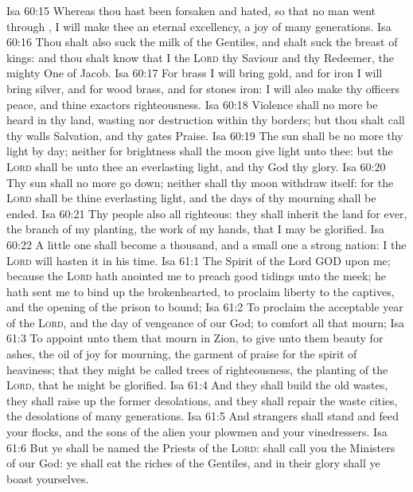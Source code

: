 \vs Isa 60:15 Whereas thou hast been forsaken and hated, so that no man went through , I will make thee an eternal excellency, a joy of many generations.
\vs Isa 60:16 Thou shalt also suck the milk of the Gentiles, and shalt suck the breast of kings: and thou shalt know that I the \textsc{Lord}  thy Saviour and thy Redeemer, the mighty One of Jacob.
\vs Isa 60:17 For brass I will bring gold, and for iron I will bring silver, and for wood brass, and for stones iron: I will also make thy officers peace, and thine exactors righteousness.
\vs Isa 60:18 Violence shall no more be heard in thy land, wasting nor destruction within thy borders; but thou shalt call thy walls Salvation, and thy gates Praise.
\vs Isa 60:19 The sun shall be no more thy light by day; neither for brightness shall the moon give light unto thee: but the \textsc{Lord} shall be unto thee an everlasting light, and thy God thy glory.
\vs Isa 60:20 Thy sun shall no more go down; neither shall thy moon withdraw itself: for the \textsc{Lord} shall be thine everlasting light, and the days of thy mourning shall be ended.
\vs Isa 60:21 Thy people also  all righteous: they shall inherit the land for ever, the branch of my planting, the work of my hands, that I may be glorified.
\vs Isa 60:22 A little one shall become a thousand, and a small one a strong nation: I the \textsc{Lord} will hasten it in his time.
\vs Isa 61:1 The Spirit of the Lord GOD  upon me; because the \textsc{Lord} hath anointed me to preach good tidings unto the meek; he hath sent me to bind up the brokenhearted, to proclaim liberty to the captives, and the opening of the prison to  bound;
\vs Isa 61:2 To proclaim the acceptable year of the \textsc{Lord}, and the day of vengeance of our God; to comfort all that mourn;
\vs Isa 61:3 To appoint unto them that mourn in Zion, to give unto them beauty for ashes, the oil of joy for mourning, the garment of praise for the spirit of heaviness; that they might be called trees of righteousness, the planting of the \textsc{Lord}, that he might be glorified.
\vs Isa 61:4 And they shall build the old wastes, they shall raise up the former desolations, and they shall repair the waste cities, the desolations of many generations.
\vs Isa 61:5 And strangers shall stand and feed your flocks, and the sons of the alien  your plowmen and your vinedressers.
\vs Isa 61:6 But ye shall be named the Priests of the \textsc{Lord}:  shall call you the Ministers of our God: ye shall eat the riches of the Gentiles, and in their glory shall ye boast yourselves.
